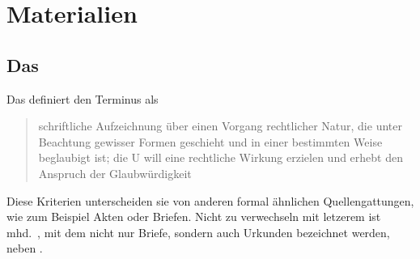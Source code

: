 \chapter{Materialien}
\label{ch:materialien}

\section%
	[Das \tit{Corpus der altdeutschen Originalurkunden}]
	{Das }%
\label{sec:materialcao}

Das  definiert den Terminus  als
\blockcquote[574]{frenz1998a}{schriftliche Aufzeichnung über einen Vorgang
rechtlicher Natur, die unter Beachtung gewisser Formen geschieht und in einer
bestimmten Weise beglaubigt ist; die U will eine rechtliche
Wirkung erzielen und erhebt den Anspruch der Glaubwürdigkeit}. Diese Kriterien
unterscheiden sie von anderen formal ähnlichen Quellengattungen, wie zum
Beispiel Akten oder Briefen. Nicht zu verwechseln mit letzerem ist mhd.\
, mit dem nicht nur Briefe, sondern auch Urkunden bezeichnet
werden, neben \norm{hantvėste} \autocites[][\pno~\fw{brief},
]{mwb1}[][\pno~]{mwb2}[vgl. auch][]{schmidtwiegand1998a}.

